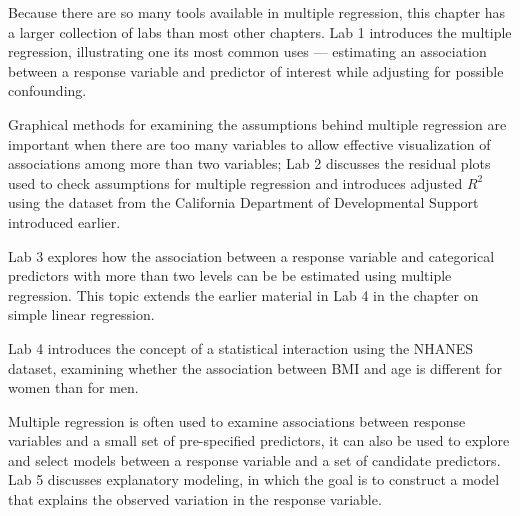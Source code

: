 Because there are so many tools available in multiple regression, this chapter has a larger collection of labs than most other chapters. Lab 1 introduces the multiple regression, illustrating one its most common uses --- estimating an association between a response variable and predictor of interest while adjusting for possible confounding.

Graphical methods for examining the assumptions behind multiple regression are important when there are too many variables to allow effective visualization of associations among more than two variables; Lab 2 discusses the residual plots used to check assumptions for multiple regression and introduces adjusted $R^2$ using the dataset from the California Department of Developmental Support introduced earlier.

Lab 3 explores how the association between a response variable and categorical predictors with more than two levels can be be estimated using multiple regression. This topic extends the earlier material in Lab 4 in the chapter on simple linear regression.

Lab 4 introduces the concept of a statistical interaction using the NHANES dataset, examining whether the association between BMI and age is different for women than for men. 

Multiple regression is often used to examine associations between response variables and a small set of pre-specified predictors, it can also be used to explore and select models between a response variable and a set of candidate predictors. Lab 5 discusses explanatory modeling, in which the goal is to construct a model that explains the observed variation in the response variable. 
 


